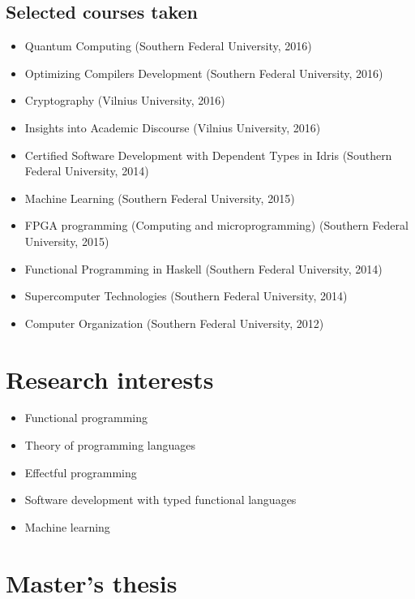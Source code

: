 \documentclass[11pt,a4paper,sans]{moderncv} %
\begin{document}
\subsection{Selected courses taken}

\begin{itemize}
  \item Quantum Computing (Southern Federal University, 2016)
  \item Optimizing Compilers Development (Southern Federal University, 2016)
  \item Cryptography (Vilnius University, 2016)
  \item Insights into Academic Discourse (Vilnius University, 2016)
  \item Certified Software Development with Dependent Types in Idris (Southern Federal University, 2014)
  \item Machine Learning (Southern Federal University, 2015)
  \item FPGA programming (Computing and microprogramming) (Southern Federal University, 2015)
  \item Functional Programming in Haskell (Southern Federal University, 2014)
  \item Supercomputer Technologies (Southern Federal University, 2014)
  \item Computer Organization (Southern Federal University, 2012)
\end{itemize}


\section{Research interests}

\begin{itemize}
  \item Functional programming
  \item Theory of programming languages
  \item Effectful programming
  \item Software development with typed functional languages
  \item Machine learning
\end{itemize}

\section{Master's thesis}
\end{document}
